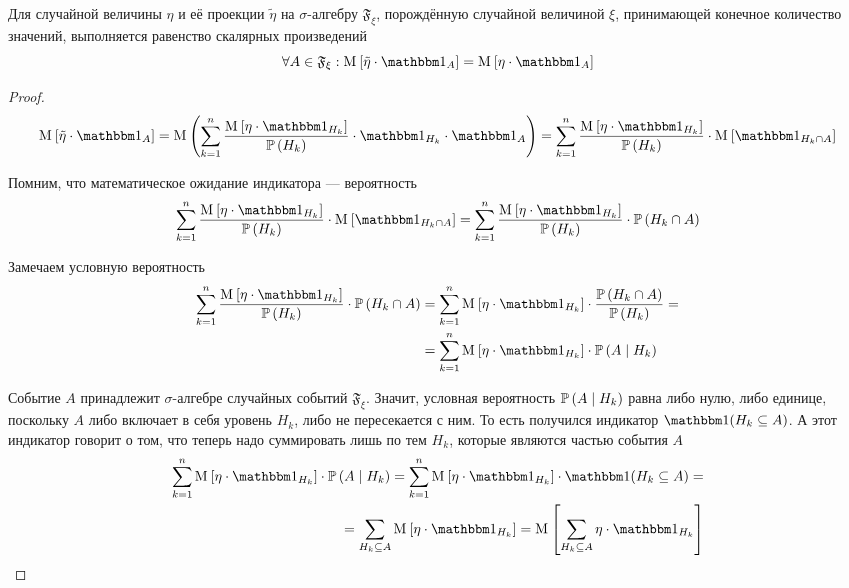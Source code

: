 \begin{lemma}
  \label{lemma:scalarMul:finiteSA}
  Для случайной величины $\eta$ и её проекции $\tilde{\eta}$
  на $\sigma$-алгебру $\mathfrak{F}_\xi$,
  порождённую случайной величиной $\xi$,
  принимающей конечное количество значений,
  выполняется равенство скалярных произведений
  \begin{equation}\label{scalarMulEquality}
      \forall A \in \mathfrak{F}_\xi:
      \Mean{ \tilde{\eta} \cdot \indicatorof{A} }
      = \Mean{ \eta \cdot \indicatorof{A} }
  \end{equation}
\end{lemma}
\begin{proof}
  \begin{equation*}
    \Mean{ \tilde{\eta} \cdot \indicatorof{A} }
    = \mean{\left( \sum_{k=1}^n
      \frac{\Mean{ \eta \cdot \indicatorof{H_k} }}
      {\probability{H_k}}
      \cdot \indicatorof{H_k} \cdot \indicatorof{A} \right)}
    = \sum_{k=1}^n
      \frac{\Mean{ \eta \cdot \indicatorof{H_k} }}
      {\probability{H_k}}
      \cdot \Mean{ \indicatorof{H_k \cap A} }
  \end{equation*}

Помним, что математическое ожидание индикатора --- вероятность
$$\sum_{k=1}^n
  \frac{\Mean{ \eta \cdot \indicatorof{H_k} }}{\probability{H_k}}
      \cdot \Mean{ \indicatorof{H_k \cap A} }
  = \sum_{k=1}^n \frac{\Mean{ \eta \cdot \indicatorof{H_k} }}
      {\probability{H_k}}
      \cdot \probability{H_k \cap A}$$

Замечаем условную вероятность
\begin{align*}
  \sum_{k=1}^n \frac{\Mean{ \eta \cdot \indicatorof{H_k} }}
      {\probability{H_k}} \cdot \probability{H_k \cap A}
  &= \sum_{k=1}^n \Mean{ \eta \cdot \indicatorof{H_k} }
      \cdot \frac{\probability{H_k \cap A}}{\probability{H_k}} = \\
  &= \sum_{k=1}^n \Mean{ \eta \cdot \indicatorof{H_k} }
      \cdot \probability{A \mcond H_k}
\end{align*}

Событие $A$ принадлежит $\sigma$-алгебре случайных событий $\mathfrak{F}_\xi$.
Значит, условная вероятность $\mathbb{P}\left( A\;\middle|\; H_k \right)$ равна
либо нулю, либо единице, поскольку $A$ либо включает в себя уровень $H_k$, либо
не пересекается с ним.
То есть получился индикатор $\indicator{H_k \subseteq A}$.
А этот индикатор говорит о том, что теперь надо суммировать лишь по тем $H_k$,
которые являются частью события $A$
\begin{align*}
\sum_{k=1}^n \Mean{ \eta \cdot \indicatorof{H_k} }
  \cdot \probability{A \mcond H_k}
  = \sum_{k=1}^n \Mean{ \eta \cdot \indicatorof{H_k} }
      \cdot \indicator{H_k \subseteq A} = \\
  = \sum_{H_k \subseteq A} \Mean{ \eta \cdot \indicatorof{H_k} }
  = \Mean{ \sum_{H_k \subseteq A} \eta \cdot \indicatorof{H_k} }
\end{align*}


\end{proof}
